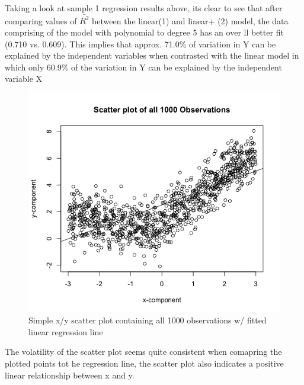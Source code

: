 \documentclass{article}
\begin{document}
\hspace{1.27cm} \par
Taking a look at sample 1 regression results above, its clear to see that after comparing values of $\bar{R^2}$ between the linear(1) and linear+ (2) model, the data comprising of the model with polynomial to degree 5 has an over ll better fit (0.710 vs. 0.609). This implies that approx. 71.0\% of variation in Y can be explained by the independent variables when contrasted with the linear model in which only 60.9\% of the variation in Y can be explained by the independent variable X
\newpage

\begin{figure}[!htb]
\caption{Simple x/y scatter plot containing all 1000 observations w/ fitted linear regression line}
\label{Figure 1}
\begin{center}
\includegraphics[scale=0.8]{sample_1k.png}
\end{center}
\end{figure}
The volatility of the scatter plot seems quite consistent when comapring the plotted points tot he regression line, the scatter plot also indicates a positive linear relationship between x and y.


\newpage
\end{document}
